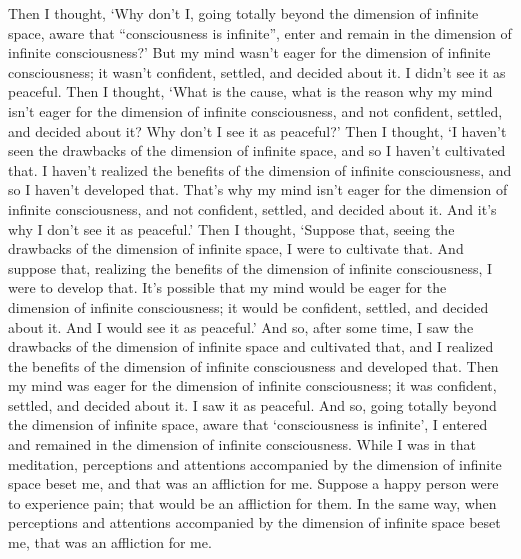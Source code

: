 \documentclass[12pt,openany]{book}%
\begin{document}
Then I thought, ‘Why don’t I, going totally beyond the dimension of infinite space, aware that “consciousness is infinite”, enter and remain in the dimension of infinite consciousness?’ But my mind wasn’t eager for the dimension of infinite consciousness; it wasn’t confident, settled, and decided about it. I didn’t see it as peaceful. Then I thought, ‘What is the cause, what is the reason why my mind isn’t eager for the dimension of infinite consciousness, and not confident, settled, and decided about it? Why don’t I see it as peaceful?’ Then I thought, ‘I haven’t seen the drawbacks of the dimension of infinite space, and so I haven’t cultivated that. I haven’t realized the benefits of the dimension of infinite consciousness, and so I haven’t developed that. That’s why my mind isn’t eager for the dimension of infinite consciousness, and not confident, settled, and decided about it. And it’s why I don’t see it as peaceful.’ Then I thought, ‘Suppose that, seeing the drawbacks of the dimension of infinite space, I were to cultivate that. And suppose that, realizing the benefits of the dimension of infinite consciousness, I were to develop that. It’s possible that my mind would be eager for the dimension of infinite consciousness; it would be confident, settled, and decided about it. And I would see it as peaceful.’ And so, after some time, I saw the drawbacks of the dimension of infinite space and cultivated that, and I realized the benefits of the dimension of infinite consciousness and developed that. Then my mind was eager for the dimension of infinite consciousness; it was confident, settled, and decided about it. I saw it as peaceful. And so, going totally beyond the dimension of infinite space, aware that ‘consciousness is infinite’, I entered and remained in the dimension of infinite consciousness. While I was in that meditation, perceptions and attentions accompanied by the dimension of infinite space beset me, and that was an affliction for me. Suppose a happy person were to experience pain; that would be an affliction for them. In the same way, when perceptions and attentions accompanied by the dimension of infinite space beset me, that was an affliction for me. 
\end{document}
